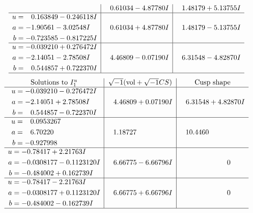 \documentclass[1p]{elsarticle_modified}
\theoremstyle{definition}
\newcommand{\I}{\sqrt{-1}}
\begin{document}
$$\begin{array}{c|c|c}
 & \phantom{-}0.61034 - 4.87780 I & \phantom{-}1.48179 + 5.13755 I \\ \hline\begin{aligned}
u &= \phantom{-}0.163849 - 0.246118 I \\
a &= -1.90561 - 3.02548 I \\
b &= -0.723585 - 0.817225 I\end{aligned}
 & \phantom{-}0.61034 + 4.87780 I & \phantom{-}1.48179 - 5.13755 I \\ \hline\begin{aligned}
u &= -0.039210 + 0.276472 I \\
a &= -2.14051 - 2.78508 I \\
b &= \phantom{-}0.544857 + 0.722370 I\end{aligned}
 & \phantom{-}4.46809 - 0.07190 I & \phantom{-}6.31548 - 4.82870 I\\
 \hline 
 \end{array}$$\newpage$$\begin{array}{c|c|c}  
\text{Solutions to }I^u_{1}& \I (\text{vol} + \sqrt{-1}CS) & \text{Cusp shape}\\
 \hline 
\begin{aligned}
u &= -0.039210 - 0.276472 I \\
a &= -2.14051 + 2.78508 I \\
b &= \phantom{-}0.544857 - 0.722370 I\end{aligned}
 & \phantom{-}4.46809 + 0.07190 I & \phantom{-}6.31548 + 4.82870 I \\ \hline\begin{aligned}
u &= \phantom{-}0.0953267\phantom{ +0.000000I} \\
a &= \phantom{-}6.70220\phantom{ +0.000000I} \\
b &= -0.927998\phantom{ +0.000000I}\end{aligned}
 & \phantom{-}1.18727\phantom{ +0.000000I} & \phantom{-}10.4460\phantom{ +0.000000I} \\ \hline\begin{aligned}
u &= -0.78417 + 2.21763 I \\
a &= -0.0308177 - 0.1123120 I \\
b &= -0.484002 + 0.162739 I\end{aligned}
 & \phantom{-}6.66775 - 6.66796 I & \phantom{-0.000000 } 0 \\ \hline\begin{aligned}
u &= -0.78417 - 2.21763 I \\
a &= -0.0308177 + 0.1123120 I \\
b &= -0.484002 - 0.162739 I\end{aligned}
 & \phantom{-}6.66775 + 6.66796 I & \phantom{-0.000000 } 0\\
 \hline 
 \end{array}$$\newpage\newpage\renewcommand{\arraystretch}{1}
\end{document}
